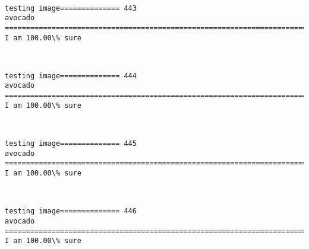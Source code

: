 \documentclass[11pt]{article}
\begin{document}
    \begin{center}
    \end{center}
    { \hspace*{\fill} \\}
    
    \begin{Verbatim}[commandchars=\\\{\}]
testing image============== 443
avocado
============================================================================
I am 100.00\% sure

    \end{Verbatim}

    \begin{center}
    \end{center}
    { \hspace*{\fill} \\}
    
    \begin{Verbatim}[commandchars=\\\{\}]
testing image============== 444
avocado
============================================================================
I am 100.00\% sure

    \end{Verbatim}

    \begin{center}
    \end{center}
    { \hspace*{\fill} \\}
    
    \begin{Verbatim}[commandchars=\\\{\}]
testing image============== 445
avocado
============================================================================
I am 100.00\% sure

    \end{Verbatim}

    \begin{center}
    \end{center}
    { \hspace*{\fill} \\}
    
    \begin{Verbatim}[commandchars=\\\{\}]
testing image============== 446
avocado
============================================================================
I am 100.00\% sure

    \end{Verbatim}
\end{document}
